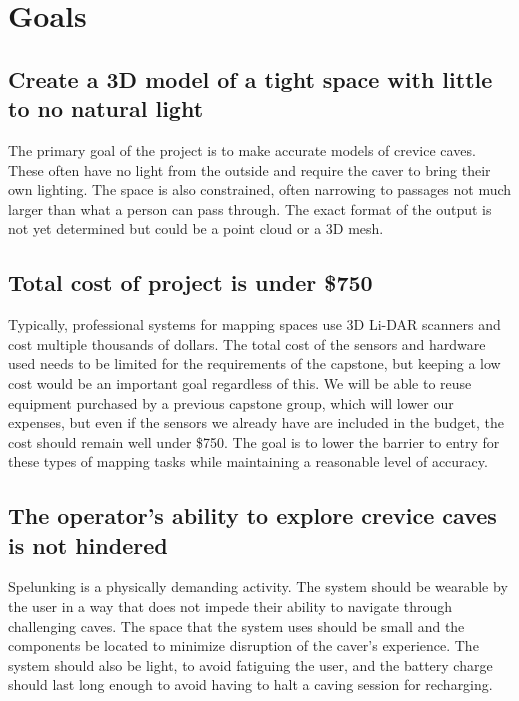 \documentclass{article}
\begin{document}
\section{Goals}

\subsection{Create a 3D model of a tight space with little to no natural light}

The primary goal of the project is to make accurate models of crevice caves. These often have
no light from the outside and require the caver to bring their own lighting. The space is also
constrained, often narrowing to passages not much larger than what a person can pass through.
The exact format of the output is not yet determined but could be a point cloud or a 3D mesh.

\subsection{Total cost of project is under \$750}

Typically, professional systems for mapping spaces use 3D Li-DAR scanners and cost multiple
thousands of dollars. The total cost of the sensors and hardware used needs to be limited for the
requirements of the capstone, but keeping a low cost would be an important goal regardless of this.
We will be able to reuse equipment purchased by a previous capstone group, which will lower our
expenses, but even if the sensors we already have are included in the budget, the cost should remain
well under \$750. The goal is to lower the barrier to entry for these types of mapping tasks while
maintaining a reasonable level of accuracy.

\subsection{The operator's ability to explore crevice caves is not hindered}

Spelunking is a physically demanding activity. The system should be wearable by the user in a
way that does not impede their ability to navigate through challenging caves. The space that the
system uses should be small and the components be located to minimize disruption of the caver’s
experience. The system should also be light, to avoid fatiguing the user, and the battery charge
should last long enough to avoid having to halt a caving session for recharging.
\end{document}
